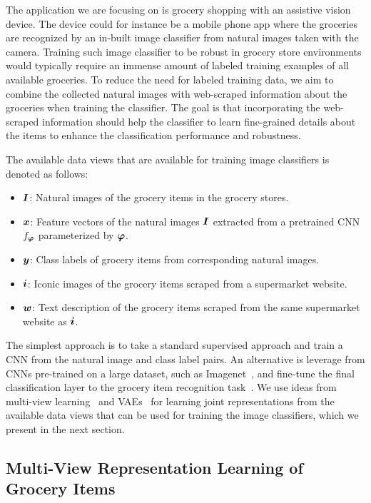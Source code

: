 The application we are focusing on is grocery shopping with an assistive vision device. The device could for instance be a mobile phone app where the groceries are recognized by an in-built image classifier from natural images taken with the camera. Training such image classifier to be robust in grocery store environments would typically require an immense amount of labeled training examples of all available groceries. To reduce the need for labeled training data, we aim to combine the collected natural images with web-scraped information about the groceries when training the classifier. The goal is that incorporating the web-scraped information should help the classifier to learn fine-grained details about the items to enhance the classification performance and robustness. 

The available data views that are available for training image classifiers is denoted as follows:
\begin{itemize}[noitemsep,topsep=1pt]
	\item ${\bm{I}}$: Natural images of the grocery items in the grocery stores.
	\item ${\bm{x}}$: Feature vectors of the natural images ${\bm{I}}$ extracted from a pretrained CNN $f_{{\bm{\varphi}}}$ parameterized by ${\bm{\varphi}}$. 
	\item ${\bm{y}}$: Class labels of grocery items from corresponding natural images.
	\item ${\bm{i}}$: Iconic images of the grocery items scraped from a supermarket website.
	\item ${\bm{w}}$: Text description of the grocery items scraped from the same supermarket website as ${\bm{i}}$.
\end{itemize}
The simplest approach is to take a standard supervised approach and train a CNN from the natural image and class label pairs. An alternative is leverage from CNNs pre-trained on a large dataset, such as Imagenet~\cite{deng2009imagenet}, and fine-tune the final classification layer to the grocery item recognition task~\cite{sharif2014cnn}. We use ideas from multi-view learning~\cite{xu2013survey} and VAEs~\cite{kingma2013auto} for learning joint representations from the available data views that can be used for training the image classifiers, which we present in the next section.  


\subsection{Multi-View Representation Learning of Grocery Items}

